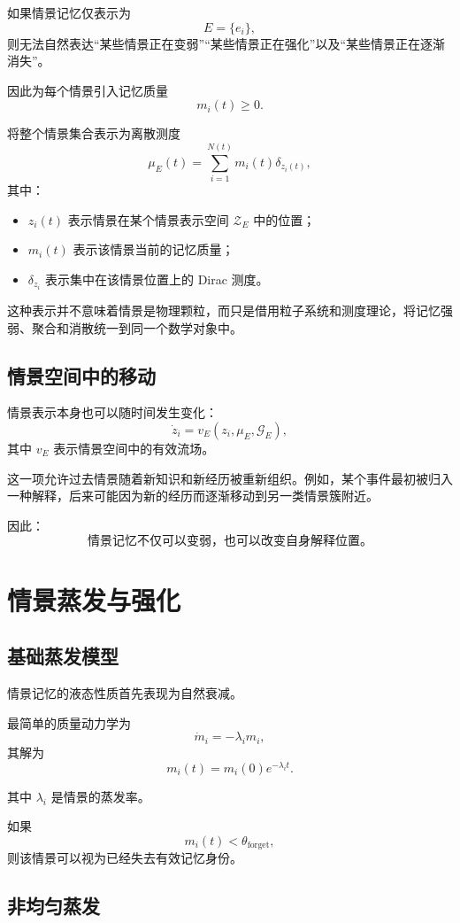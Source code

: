 如果情景记忆仅表示为
\[
E=\{e_i\},
\]
则无法自然表达“某些情景正在变弱”“某些情景正在强化”以及“某些情景正在逐渐消失”。

因此为每个情景引入记忆质量
\[
m_i(t)\geq0.
\]

将整个情景集合表示为离散测度
\[
\boxed{
\mu_E(t)
=
\sum_{i=1}^{N(t)}
m_i(t)
\delta_{z_i(t)},
}
\]
其中：

\begin{itemize}
    \item $z_i(t)$ 表示情景在某个情景表示空间 $\mathcal{Z}_E$ 中的位置；
    \item $m_i(t)$ 表示该情景当前的记忆质量；
    \item $\delta_{z_i}$ 表示集中在该情景位置上的 Dirac 测度。
\end{itemize}

这种表示并不意味着情景是物理颗粒，而只是借用粒子系统和测度理论，将记忆强弱、聚合和消散统一到同一个数学对象中。

\subsection{情景空间中的移动}

情景表示本身也可以随时间发生变化：
\[
\boxed{
\dot z_i
=
v_E
\left(
z_i,
\mu_E,
\mathcal{G}_E
\right),
}
\]
其中 $v_E$ 表示情景空间中的有效流场。

这一项允许过去情景随着新知识和新经历被重新组织。例如，某个事件最初被归入一种解释，后来可能因为新的经历而逐渐移动到另一类情景簇附近。

因此：
\[
\boxed{
\text{情景记忆不仅可以变弱，也可以改变自身解释位置。}
}
\]

\section{情景蒸发与强化}

\subsection{基础蒸发模型}

情景记忆的液态性质首先表现为自然衰减。

最简单的质量动力学为
\[
\dot m_i
=
-\lambda_i m_i,
\]
其解为
\[
m_i(t)
=
m_i(0)e^{-\lambda_i t}.
\]

其中 $\lambda_i$ 是情景的蒸发率。

如果
\[
m_i(t)<\theta_{\mathrm{forget}},
\]
则该情景可以视为已经失去有效记忆身份。

\subsection{非均匀蒸发}

